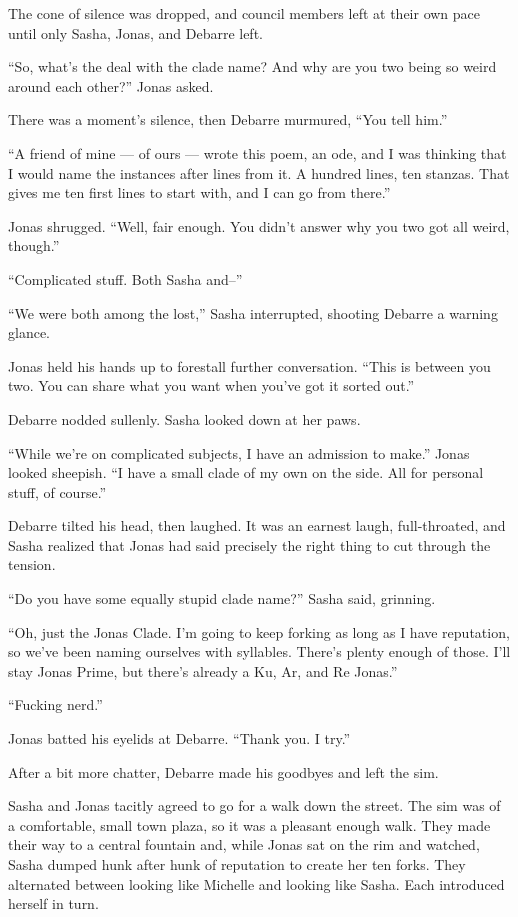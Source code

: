 The cone of silence was dropped, and council members left at their own pace until only Sasha, Jonas, and Debarre left.

``So, what's the deal with the clade name? And why are you two being so weird around each other?'' Jonas asked.

There was a moment's silence, then Debarre murmured, ``You tell him.''

``A friend of mine — of ours — wrote this poem, an ode, and I was thinking that I would name the instances after lines from it. A hundred lines, ten stanzas. That gives me ten first lines to start with, and I can go from there.''

Jonas shrugged. ``Well, fair enough. You didn't answer why you two got all weird, though.''

``Complicated stuff. Both Sasha and--''

``We were both among the lost,'' Sasha interrupted, shooting Debarre a warning glance.

Jonas held his hands up to forestall further conversation. ``This is between you two. You can share what you want when you've got it sorted out.''

Debarre nodded sullenly. Sasha looked down at her paws.

``While we're on complicated subjects, I have an admission to make.'' Jonas looked sheepish. ``I have a small clade of my own on the side. All for personal stuff, of course.''

Debarre tilted his head, then laughed. It was an earnest laugh, full-throated, and Sasha realized that Jonas had said precisely the right thing to cut through the tension.

``Do you have some equally stupid clade name?'' Sasha said, grinning.

``Oh, just the Jonas Clade. I'm going to keep forking as long as I have reputation, so we've been naming ourselves with syllables. There's plenty enough of those. I'll stay Jonas Prime, but there's already a Ku, Ar, and Re Jonas.''

``Fucking nerd.''

Jonas batted his eyelids at Debarre. ``Thank you. I try.''

After a bit more chatter, Debarre made his goodbyes and left the sim.

Sasha and Jonas tacitly agreed to go for a walk down the street. The sim was of a comfortable, small town plaza, so it was a pleasant enough walk. They made their way to a central fountain and, while Jonas sat on the rim and watched, Sasha dumped hunk after hunk of reputation to create her ten forks. They alternated between looking like Michelle and looking like Sasha. Each introduced herself in turn.

